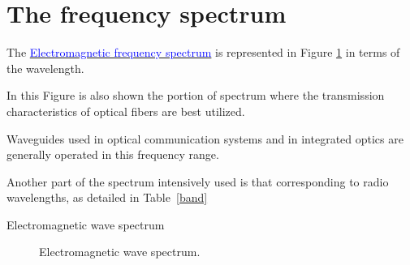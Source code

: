 \documentclass[10pt]{beamer}
\begin{document}
%



\section{The frequency spectrum}


\begin{frame}[fragile]{}
%
The \href{https://en.wikipedia.org/wiki/Electromagnetic_spectrum}{\textcolor{blue}{Electromagnetic frequency  spectrum}}
  is  represented in
Figure \ref{EMspectrum} in terms of the wavelength. 

In this
Figure is also shown the portion of spectrum where the
transmission characteristics of optical fibers are best
utilized.  

Waveguides used in optical communication
systems and in integrated optics are generally operated in this
frequency range. 

Another part of the spectrum intensively used is
that corresponding to radio wavelengths, as detailed in
Table~\ref{band} 

\end{frame}
\begin{frame}[shrink=10]{Electromagnetic wave spectrum}
\begin{figure}[tb]
\EMspectrum
\caption{Electromagnetic wave spectrum.}
\label{EMspectrum} 
\end{figure}

\end{frame}
\end{document}
